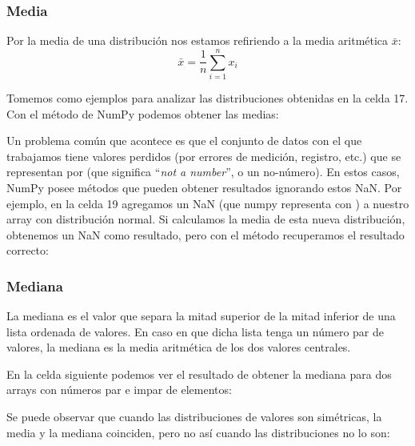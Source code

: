 \subsubsection{Media} 

Por la media de una distribución nos estamos refiriendo a la media aritmética $\bar{x}$:
\begin{equation*}
    \bar{x} = \frac{1}{n} \sum_{i=1}^n x_i
\end{equation*}

Tomemos como ejemplos para analizar las distribuciones obtenidas en la celda 17. Con el método  de NumPy podemos obtener las medias:


Un problema común que acontece es que el conjunto de datos con el que trabajamos tiene valores perdidos (por errores de medición, registro, etc.) que se representan por  (que significa ``\textit{not a number}'', o un no-número). En estos casos, NumPy posee métodos que pueden obtener resultados ignorando estos NaN. Por ejemplo, en la celda 19 agregamos un NaN (que numpy representa con ) a nuestro array con distribución normal. Si calculamos la media de esta nueva distribución, obtenemos un NaN como resultado, pero con el método  recuperamos el resultado correcto:


\subsubsection{Mediana}

La mediana es el valor que separa la mitad superior de la mitad inferior de una lista ordenada de valores. En caso en que dicha lista tenga un número par de valores, la mediana es la media aritmética de los dos valores centrales.

En la celda siguiente podemos ver el resultado de obtener la mediana para dos arrays con números par e impar de elementos:


Se puede observar que cuando las distribuciones de valores son simétricas, la media y la mediana coinciden, pero no así cuando las distribuciones no lo son:


